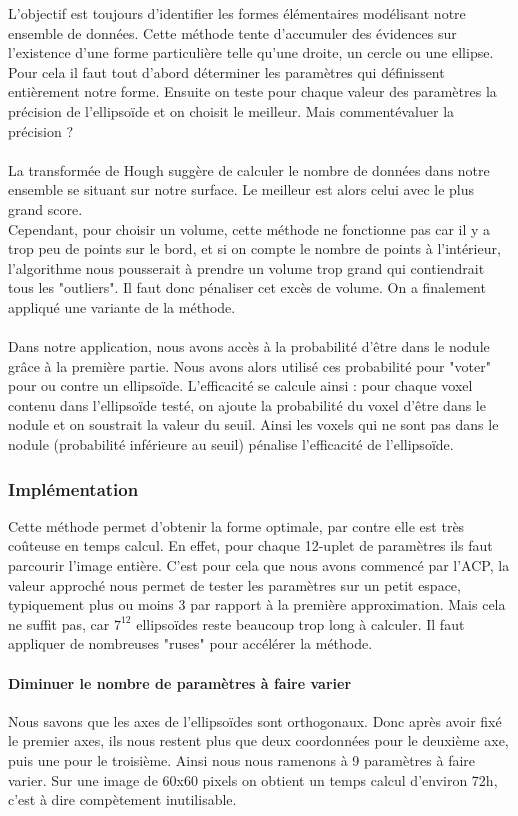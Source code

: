 \documentclass{article}
\begin{document}
L'objectif est toujours d'identifier les formes élémentaires modélisant notre ensemble de données. Cette méthode tente d'accumuler des évidences sur l'existence d'une forme particulière telle qu'une droite, un cercle ou  une ellipse. Pour cela il faut tout d'abord déterminer les paramètres qui définissent entièrement notre forme. Ensuite on teste pour chaque valeur des paramètres la précision de l'ellipsoïde et on choisit le meilleur. Mais commentévaluer la précision ?\\\\
La transformée de Hough suggère de calculer le nombre de données dans notre ensemble se situant sur notre surface. Le meilleur est alors celui avec le plus grand score.\\
Cependant, pour choisir un volume, cette méthode ne fonctionne pas car il y a trop peu de points sur le bord, et si on compte le nombre de points à l'intérieur, l'algorithme nous pousserait à prendre un volume trop grand qui contiendrait tous les "outliers". Il faut donc pénaliser cet excès de volume. On a finalement appliqué une variante de la méthode.\\\\
Dans notre application, nous avons accès à la probabilité d'être dans le nodule grâce à la première partie. Nous avons alors utilisé ces probabilité pour "voter" pour ou contre un ellipsoïde. L'efficacité se calcule ainsi : pour chaque voxel contenu dans l'ellipsoïde testé, on ajoute la probabilité du voxel d'être dans le nodule et on soustrait la valeur du seuil. Ainsi les voxels qui ne sont pas dans le nodule (probabilité inférieure au seuil) pénalise l'efficacité de l'ellipsoïde.

\subsubsection{Implémentation}

Cette méthode permet d'obtenir la forme optimale, par contre elle est très coûteuse en temps calcul. En effet, pour chaque 12-uplet de paramètres ils faut parcourir l'image entière. C'est pour cela que nous avons commencé par l'ACP, la valeur approché nous permet de tester les paramètres sur un petit espace, typiquement plus ou moins 3 par rapport à la première approximation. Mais cela ne suffit pas, car $7^{12}$ ellipsoïdes reste beaucoup trop long à calculer. Il faut appliquer de nombreuses "ruses" pour accélérer la méthode.\\

\paragraph{Diminuer le nombre de paramètres à faire varier} Nous savons que les axes de l'ellipsoïdes sont orthogonaux. Donc après avoir fixé le premier axes, ils nous restent plus que deux coordonnées pour le deuxième axe, puis une pour le troisième. Ainsi nous nous ramenons à 9 paramètres à faire varier. Sur une image de 60x60 pixels on obtient un temps calcul d'environ 72h, c'est à dire compètement inutilisable.
\end{document}
